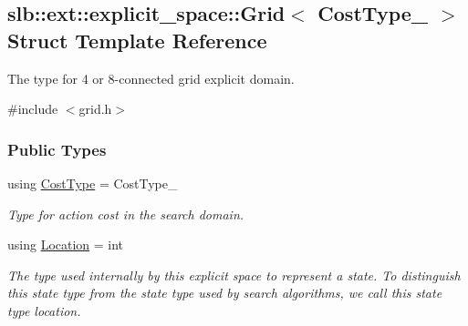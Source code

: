 \hypertarget{structslb_1_1ext_1_1explicit__space_1_1Grid}{}\subsection{slb\+:\+:ext\+:\+:explicit\+\_\+space\+:\+:Grid$<$ Cost\+Type\+\_\+ $>$ Struct Template Reference}
\label{structslb_1_1ext_1_1explicit__space_1_1Grid}


The type for 4 or 8-\/connected grid explicit domain.  




{\ttfamily \#include $<$grid.\+h$>$}

\subsubsection*{Public Types}
\begin{DoxyCompactItemize}
\item 
using \hyperlink{structslb_1_1ext_1_1explicit__space_1_1Grid_a800819a8f2c96bf76dd9d36c18760815}{Cost\+Type} = Cost\+Type\+\_\+\hypertarget{structslb_1_1ext_1_1explicit__space_1_1Grid_a800819a8f2c96bf76dd9d36c18760815}{}\label{structslb_1_1ext_1_1explicit__space_1_1Grid_a800819a8f2c96bf76dd9d36c18760815}

\begin{DoxyCompactList}\small\item\em Type for action cost in the search domain. \end{DoxyCompactList}\item 
using \hyperlink{structslb_1_1ext_1_1explicit__space_1_1Grid_a2b2125f1774b299ea7f0f9f21d967fde}{Location} = int\hypertarget{structslb_1_1ext_1_1explicit__space_1_1Grid_a2b2125f1774b299ea7f0f9f21d967fde}{}\label{structslb_1_1ext_1_1explicit__space_1_1Grid_a2b2125f1774b299ea7f0f9f21d967fde}

\begin{DoxyCompactList}\small\item\em The type used internally by this explicit space to represent a state. To distinguish this state type from the state type used by search algorithms, we call this state type {\ttfamily location}. \end{DoxyCompactList}\end{DoxyCompactItemize}
